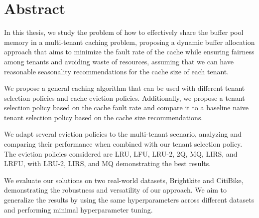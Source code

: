 \section*{\Huge \textbf{Abstract}}

\vspace{0.5cm}

In this thesis, we study the problem of how to effectively share the buffer pool memory in a 
multi-tenant caching problem, proposing a dynamic buffer allocation approach that aims to 
minimize the fault rate of the cache while ensuring fairness among tenants and avoiding 
waste of resources, assuming that we can have reasonable seasonality recommendations for 
the cache size of each tenant.

We propose a general caching algorithm that can be used with different tenant selection 
policies and cache eviction policies. Additionally, we propose a tenant selection policy 
based on the cache fault rate and compare it to a baseline naive tenant selection policy 
based on the cache size recommendations.

We adapt several eviction policies to the multi-tenant scenario, analyzing and comparing 
their performance when combined with our tenant selection policy. The eviction policies 
considered are LRU, LFU, LRU-2, 2Q, MQ, LIRS, and LRFU, with LRU-2, LIRS, and MQ 
demonstrating the best results.

We evaluate our solutions on two real-world datasets, Brightkite and CitiBike, demonstrating 
the robustness and versatility of our approach. We aim to generalize the results by using 
the same hyperparameters across different datasets and performing minimal hyperparameter 
tuning.